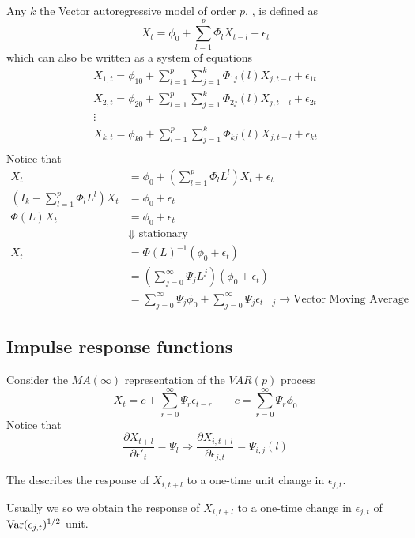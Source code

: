 Any $k$ the Vector autoregressive model of order $p$, , is defined as
\begin{equation*}
    X_t = \phi_0 + \sum_{l=1}^{p} \Phi_l X_{t-l} + \epsilon_t
\end{equation*}
which can also be written as a system of equations
\begin{gather*}
    X_{1,t} = \phi_{10} + \sum_{l=1}^{p} \sum_{j=1}^{k} \Phi_{1j}(l) X_{j,t-l} + \epsilon_{1t}\\
    X_{2,t} = \phi_{20} + \sum_{l=1}^{p} \sum_{j=1}^{k} \Phi_{2j}(l) X_{j,t-l} + \epsilon_{2t}\\
    \vdots\\
    X_{k,t} = \phi_{k0} + \sum_{l=1}^{p} \sum_{j=1}^{k} \Phi_{kj}(l) X_{j,t-l} + \epsilon_{kt}\\
\end{gather*}
Notice that
\begin{align*}
    X_t & = \phi_0 + (\sum_{l=1}^{p} \Phi_l L^l) X_{t} + \epsilon_t\\
    (I_k - \sum_{l=1}^{p} \Phi_l L^l) X_t & = \phi_0 + \epsilon_t\\
    \Phi(L) X_t & = \phi_0 + \epsilon_t\\
    & \Downarrow \text{ stationary}\\
    X_t & = \Phi(L)^{-1} (\phi_0 + \epsilon_t)\\
    & = (\sum_{j=0}^{\infty}\Psi_j L^j)(\phi_0 + \epsilon_t)\\
    & = \sum_{j=0}^{\infty}\Psi_j \phi_0 + \sum_{j=0}^{\infty}\Psi_j \epsilon_{t-j} \to \text{Vector Moving Average}
\end{align*}

\subsection{Impulse response functions}

Consider the $MA(\infty)$ representation of the $VAR(p)$ process
\begin{equation*}
    X_t = c + \sum_{r=0}^{\infty} \Psi_r \epsilon_{t-r}\qquad c = \sum_{r=0}^{\infty} \Psi_r\phi_0
\end{equation*}
Notice that 
\begin{equation*}
    \frac{\partial X_{t+l}}{\partial \epsilon'_t} = \Psi_l \Rightarrow \frac{\partial X_{i,t+l}}{\partial \epsilon_{j,t}} = \Psi_{i,j}(l)
\end{equation*}
\begin{definition}
    The  describes the response of $X_{i,t+l}$ to a one-time unit change in $\epsilon_{j,t}$.
\end{definition}
Usually we  so we obtain the response of $X_{i,t+l}$ to a one-time change in $\epsilon_{j,t}$ of $\operatorname{Var}(\epsilon_{j,t})^{1/2}$ unit.

